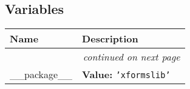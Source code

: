 
  \subsection{Variables}

    \vspace{-1cm}
\hspace{\varindent}\begin{longtable}{|p{\varnamewidth}|p{\vardescrwidth}|l}
\cline{1-2}
\cline{1-2} \centering \textbf{Name} & \centering \textbf{Description}& \\
\cline{1-2}
\endhead\cline{1-2}\multicolumn{3}{r}{\small\textit{continued on next page}}\\\endfoot\cline{1-2}
\endlastfoot\raggedright \_\-\_\-p\-a\-c\-k\-a\-g\-e\-\_\-\_\- & \raggedright \textbf{Value:} 
{\tt \texttt{'}\texttt{xformslib}\texttt{'}}&\\
\cline{1-2}
\end{longtable}

